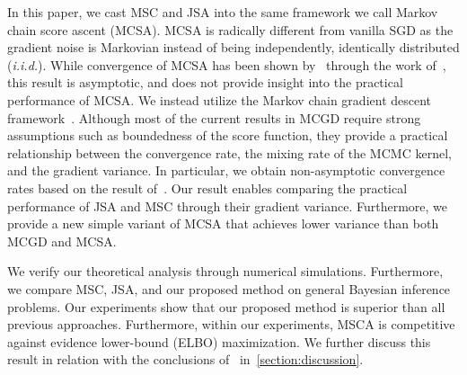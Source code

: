 In this paper, we cast MSC and JSA into the same framework we call Markov chain score ascent (MCSA).
MCSA is radically different from vanilla SGD as the gradient noise is Markovian instead of being independently, identically distributed (\textit{i.i.d.}).
While convergence of MCSA has been shown by~\citet{NEURIPS2020_b2070693} through the work of~\citet{gu_stochastic_1998}, this result is asymptotic, and does not provide insight into the practical performance of MCSA.
We instead utilize the Markov chain gradient descent framework~\citet{duchi_ergodic_2012, NEURIPS2018_1371bcce, pmlr-v99-karimi19a, doan_convergence_2020}.
Although most of the current results in MCGD require strong assumptions such as boundedness of the score function, they provide a practical relationship between the convergence rate, the mixing rate of the MCMC kernel, and the gradient variance.
In particular, we obtain non-asymptotic convergence rates based on the result of~\citet{duchi_ergodic_2012}.
Our result enables comparing the practical performance of JSA and MSC through their gradient variance.
Furthermore, we provide a new simple variant of MCSA that achieves lower variance than both MCGD and MCSA.

We verify our theoretical analysis through numerical simulations.
Furthermore, we compare MSC, JSA, and our proposed method on general Bayesian inference problems.
Our experiments show that our proposed method is superior than all previous approaches.
Furthermore, within our experiments, MSCA is competitive against evidence lower-bound (ELBO) maximization.
We further discuss this result in relation with the conclusions of~\citet{dhaka_challenges_2021} in~\cref{section:discussion}.

